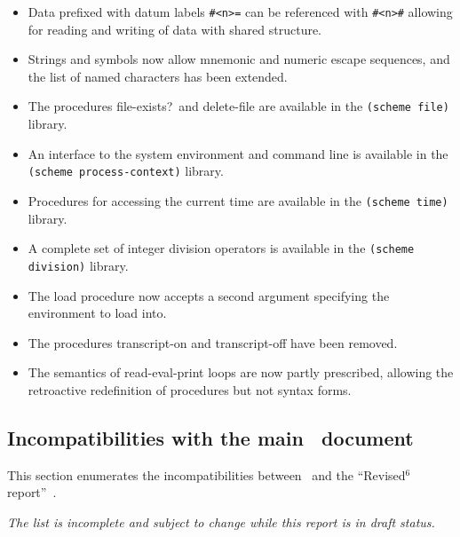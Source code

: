 \begin{itemize}
\item Data prefixed with datum labels {\tt \#<n>=} can be referenced
with {\tt \#<n>\#} allowing for reading and writing of data with
shared structure.

\item Strings and symbols now allow mnemonic and numeric escape
sequences, and the list of named characters has been extended.

\item The procedures {\cf file-exists?}\ and {\cf delete-file} are available in the
{\tt (scheme file)} library.

\item An interface to the system environment and command line is
available in the {\tt (scheme process-context)} library.

\item Procedures for accessing the current time are available in the
{\tt (scheme time)} library.

\item A complete set of integer division operators is available in the
{\tt (scheme division)} library.

\item The {\cf load} procedure now accepts a second argument specifying the environment to
load into.

\item The procedures {\cf transcript-on} and {\cf transcript-off} have been removed.

\item The semantics of read-eval-print loops are now partly prescribed,
allowing the retroactive redefinition of procedures but not syntax forms.

\end{itemize}

\subsection*{Incompatibilities with the main \rsixrs\ document}
This section enumerates the incompatibilities between \rsevenrs~and
the ``Revised$^6$ report''~\cite{R6RS}.

{\em The list is incomplete and subject to change while this report is in draft status.}

